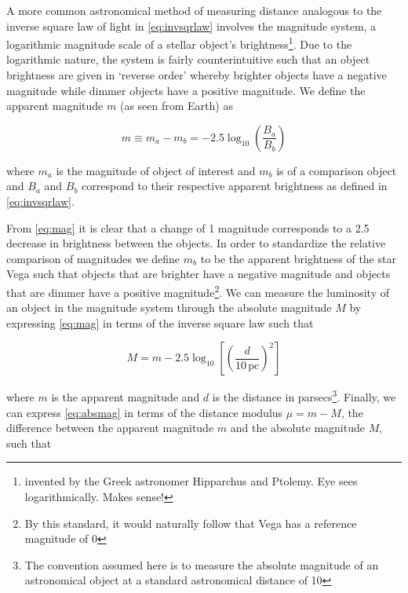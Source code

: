 A more common astronomical method of measuring distance analogous to the
inverse square law of light in \cref{eq:invsqrlaw}
involves the magnitude system, a logarithmic magnitude scale of a
stellar object's
brightness\footnote{invented by the Greek astronomer Hipparchus and Ptolemy. Eye sees logarithmically. Makes sense!}.
Due to the logarithmic nature, the system is fairly counterintuitive
such that an object brightness are given in `reverse order' whereby
brighter objects have a negative magnitude while dimmer objects have a
positive magnitude. We define the apparent magnitude \(m\) (as seen from
Earth) as

\begin{equation}m \equiv m_a - m_b = -2.5 \log_{10} \left( \frac{B_a}{B_b} \right)\label{eq:mag}\end{equation}

\noindent where \(m_a\) is the magnitude of object of interest and
\(m_b\) is of a comparison object and \(B_a\) and \(B_b\) correspond to
their respective apparent brightness as defined in
\cref{eq:invsqrlaw}.

From \cref{eq:mag} it is clear that a change of 1
magnitude corresponds to a 2.5 decrease in brightness between the
objects. In order to standardize the relative comparison of magnitudes
we define \(m_b\) to be the apparent brightness of the star Vega such
that objects that are brighter have a negative magnitude and objects
that are dimmer have a positive
magnitude\footnote{By this standard, it would naturally follow that Vega has a reference magnitude of 0}.
We can measure the luminosity of an object in the magnitude system
through the absolute magnitude \(M\) by expressing
\cref{eq:mag} in terms of the inverse square law such that

\begin{equation}M = m - 2.5 \log_{10} \left[ \left( \frac{d}{10\, \text{pc}} \right)^2 \right] \label{eq:absmag}\end{equation}

\noindent where \(m\) is the apparent magnitude and \(d\) is the
distance in
parsecs\footnote{The convention assumed here is to measure the absolute magnitude of an astronomical object at a standard astronomical distance of 10\si{\parsec}}.
Finally, we can express \cref{eq:absmag} in terms of the
distance modulus \(\mu = m - M\), the difference between the apparent
magnitude \(m\) and the absolute magnitude \(M\), such that

